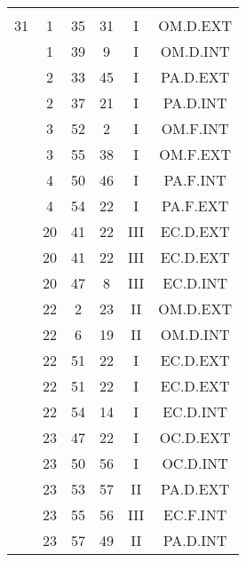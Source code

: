\documentclass[12pt, a4paper]{article}
\begin{document}
\begin{multicols}{3}
{\begin{tabular}{c c c c c c}
	 	 	 	 & & & & & \\%
	 	 	 	31 & 1 & 35 & 31 & I & OM.D.EXT\\%
	 	 	 	 & 1 & 39 & 9 & I & OM.D.INT\\%
	 	 	 	 & 2 & 33 & 45 & I & PA.D.EXT\\%
	 	 	 	 & 2 & 37 & 21 & I & PA.D.INT\\%
	 	 	 	 & 3 & 52 & 2 & I & OM.F.INT\\%
	 	 	 	 & 3 & 55 & 38 & I & OM.F.EXT\\%
	 	 	 	 & 4 & 50 & 46 & I & PA.F.INT\\%
	 	 	 	 & 4 & 54 & 22 & I & PA.F.EXT\\%
	 	 	 	 & 20 & 41 & 22 & III & EC.D.EXT\\%
	 	 	 	 & 20 & 41 & 22 & III & EC.D.EXT\\%
	 	 	 	 & 20 & 47 & 8 & III & EC.D.INT\\%
	 	 	 	 & 22 & 2 & 23 & II & OM.D.EXT\\%
	 	 	 	 & 22 & 6 & 19 & II & OM.D.INT\\%
	 	 	 	 & 22 & 51 & 22 & I & EC.D.EXT\\%
	 	 	 	 & 22 & 51 & 22 & I & EC.D.EXT\\%
	 	 	 	 & 22 & 54 & 14 & I & EC.D.INT\\%
	 	 	 	 & 23 & 47 & 22 & I & OC.D.EXT\\%
	 	 	 	 & 23 & 50 & 56 & I & OC.D.INT\\%
	 	 	 	 & 23 & 53 & 57 & II & PA.D.EXT\\%
	 	 	 	 & 23 & 55 & 56 & III & EC.F.INT\\%
	 	 	 	 & 23 & 57 & 49 & II & PA.D.INT\\%
	 	 \end{tabular}
 	}
\end{multicols}
\end{document}
